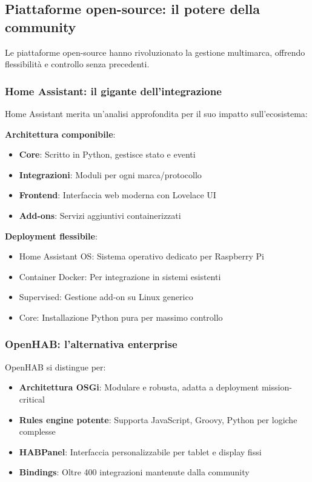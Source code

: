 \subsection{Piattaforme open-source: il potere della community}

Le piattaforme open-source hanno rivoluzionato la gestione multimarca, offrendo flessibilità e controllo senza precedenti.

\subsubsection{Home Assistant: il gigante dell'integrazione}

Home Assistant merita un'analisi approfondita per il suo impatto sull'ecosistema:

\textbf{Architettura componibile}:
\begin{itemize}
    \item \textbf{Core}: Scritto in Python, gestisce stato e eventi
    \item \textbf{Integrazioni}: Moduli per ogni marca/protocollo
    \item \textbf{Frontend}: Interfaccia web moderna con Lovelace UI
    \item \textbf{Add-ons}: Servizi aggiuntivi containerizzati
\end{itemize}

\textbf{Deployment flessibile}:
\begin{itemize}
    \item Home Assistant OS: Sistema operativo dedicato per Raspberry Pi
    \item Container Docker: Per integrazione in sistemi esistenti
    \item Supervised: Gestione add-on su Linux generico
    \item Core: Installazione Python pura per massimo controllo
\end{itemize}

\subsubsection{OpenHAB: l'alternativa enterprise}

OpenHAB si distingue per:

\begin{itemize}
    \item \textbf{Architettura OSGi}: Modulare e robusta, adatta a deployment mission-critical
    \item \textbf{Rules engine potente}: Supporta JavaScript, Groovy, Python per logiche complesse
    \item \textbf{HABPanel}: Interfaccia personalizzabile per tablet e display fissi
    \item \textbf{Bindings}: Oltre 400 integrazioni mantenute dalla community
\end{itemize}

